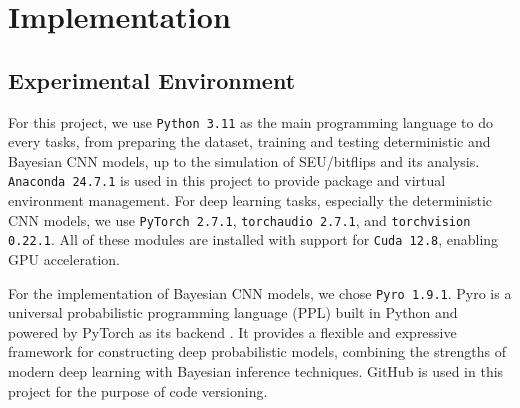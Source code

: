 \documentclass[ %
                    author={Revalda Putawara},
                supervisor={Dr. James Pope},
                    degree={MSc},
                     title={Robustness of Bayesian Neural Networks Design Choices Against Weight and Bias Perturbation Induced by Single Event Upsets (SEUs)},
                      type={},
                      year={2025}]{dissertation}
\begin{document}
\chapter{Implementation}
\label{chap:implementation}

\section{Experimental Environment}

For this project, we use \texttt{Python 3.11} as the main programming language to do every tasks, from preparing the dataset, training and testing deterministic and Bayesian CNN models, up to the simulation of SEU/bitflips and its analysis. \texttt{Anaconda 24.7.1} is used in this project to provide package and virtual environment management. For deep learning tasks, especially the deterministic CNN models, we use \texttt{PyTorch 2.7.1}, \texttt{torchaudio 2.7.1}, and \texttt{torchvision 0.22.1}. All of these modules are installed with support for \texttt{Cuda 12.8}, enabling GPU acceleration.

For the implementation of Bayesian CNN models, we chose \texttt{Pyro 1.9.1}. Pyro is a universal probabilistic programming language (PPL) built in Python and powered by PyTorch as its backend \cite{bingham2018pyro}. It provides a flexible and expressive framework for constructing deep probabilistic models, combining the strengths of modern deep learning with Bayesian inference techniques. GitHub is used in this project for the purpose of code versioning.
\end{document}
